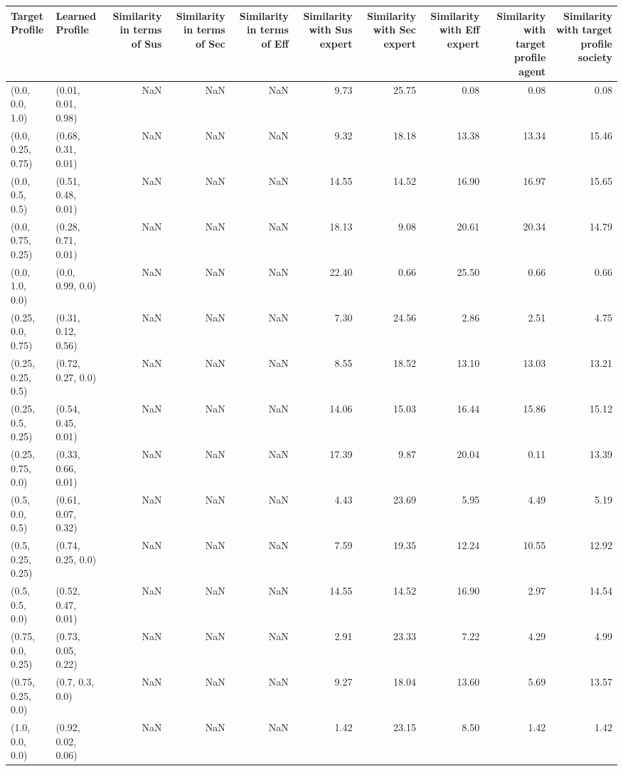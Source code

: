\begin{tabular}{llrrrrrrrr}
\toprule
Target Profile & Learned Profile & Similarity in terms of Sus & Similarity in terms of Sec & Similarity in terms of Eff & Similarity with Sus expert & Similarity with Sec expert & Similarity with Eff expert & Similarity with target profile agent & Similarity with target profile society \\
\midrule
(0.0, 0.0, 1.0) & (0.01, 0.01, 0.98) & NaN & NaN & NaN & 9.73 & 25.75 & 0.08 & 0.08 & 0.08 \\
(0.0, 0.25, 0.75) & (0.68, 0.31, 0.01) & NaN & NaN & NaN & 9.32 & 18.18 & 13.38 & 13.34 & 15.46 \\
(0.0, 0.5, 0.5) & (0.51, 0.48, 0.01) & NaN & NaN & NaN & 14.55 & 14.52 & 16.90 & 16.97 & 15.65 \\
(0.0, 0.75, 0.25) & (0.28, 0.71, 0.01) & NaN & NaN & NaN & 18.13 & 9.08 & 20.61 & 20.34 & 14.79 \\
(0.0, 1.0, 0.0) & (0.0, 0.99, 0.0) & NaN & NaN & NaN & 22.40 & 0.66 & 25.50 & 0.66 & 0.66 \\
(0.25, 0.0, 0.75) & (0.31, 0.12, 0.56) & NaN & NaN & NaN & 7.30 & 24.56 & 2.86 & 2.51 & 4.75 \\
(0.25, 0.25, 0.5) & (0.72, 0.27, 0.0) & NaN & NaN & NaN & 8.55 & 18.52 & 13.10 & 13.03 & 13.21 \\
(0.25, 0.5, 0.25) & (0.54, 0.45, 0.01) & NaN & NaN & NaN & 14.06 & 15.03 & 16.44 & 15.86 & 15.12 \\
(0.25, 0.75, 0.0) & (0.33, 0.66, 0.01) & NaN & NaN & NaN & 17.39 & 9.87 & 20.04 & 0.11 & 13.39 \\
(0.5, 0.0, 0.5) & (0.61, 0.07, 0.32) & NaN & NaN & NaN & 4.43 & 23.69 & 5.95 & 4.49 & 5.19 \\
(0.5, 0.25, 0.25) & (0.74, 0.25, 0.0) & NaN & NaN & NaN & 7.59 & 19.35 & 12.24 & 10.55 & 12.92 \\
(0.5, 0.5, 0.0) & (0.52, 0.47, 0.01) & NaN & NaN & NaN & 14.55 & 14.52 & 16.90 & 2.97 & 14.54 \\
(0.75, 0.0, 0.25) & (0.73, 0.05, 0.22) & NaN & NaN & NaN & 2.91 & 23.33 & 7.22 & 4.29 & 4.99 \\
(0.75, 0.25, 0.0) & (0.7, 0.3, 0.0) & NaN & NaN & NaN & 9.27 & 18.04 & 13.60 & 5.69 & 13.57 \\
(1.0, 0.0, 0.0) & (0.92, 0.02, 0.06) & NaN & NaN & NaN & 1.42 & 23.15 & 8.50 & 1.42 & 1.42 \\
\bottomrule
\end{tabular}
